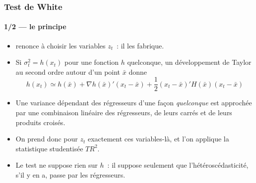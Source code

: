 \documentclass[10pt]{beamer}
\begin{document}
\begin{frame}
  \frametitle{Test de White}
  \framesubtitle{1/2 --- le principe}

  \begin{itemize}

  \item \cite{White1980} renonce à choisir les variables $z_t$~: il les
    fabrique.\newline

  \item Si $\sigma_t^2 = h(x_t)$ pour une fonction $h$ quelconque, un
    développement de Taylor au second ordre autour d'un point $\bar x$ donne
    \[
      h(x_t) \simeq h(\bar x) + \nabla h(\bar x)'(x_t-\bar x)
      + \frac{1}{2}(x_t-\bar x)'H(\bar x)(x_t-\bar x)
    \]

  \item[$\Rightarrow$] Une variance dépendant des régresseurs d'une façon
    \emph{quelconque} est approchée par une combinaison linéaire des
    régresseurs, de leurs carrés et de leurs produits croisés.\newline

  \item On prend donc pour $z_t$ exactement ces variables-là, et l'on applique
    la statistique studentisée $TR^2$.\newline

  \item[$\Rightarrow$] Le test ne suppose rien sur $h$~: il suppose seulement
    que l'hétéroscédasticité, s'il y en a, passe par les régresseurs.

  \end{itemize}

\end{frame}
\end{document}
